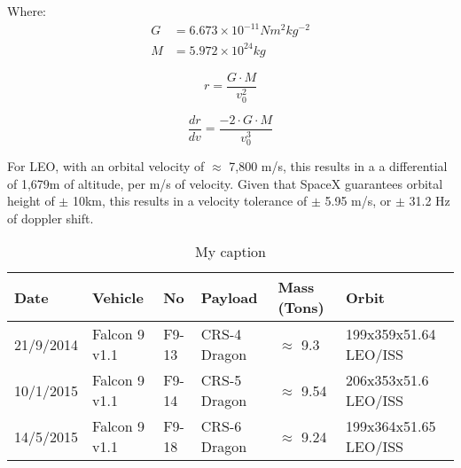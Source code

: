 Where:
\begin{align*}
G &= 6.673 \times 10^{-11} N m^2 kg^{-2}\\
M &= 5.972 \times 10^{24} kg
\end{align*}

\begin{equation}
r = \frac{G \cdot M}{v_0^2}
\end{equation}

\begin{equation}
\frac{dr}{dv} = \frac{-2 \cdot G \cdot M}{v_0^3}
\end{equation}

For \ac{LEO}, with an orbital velocity of $\approx$ 7,800 m/s, this results in a a differential of 1,679m of altitude, per m/s of velocity. Given that SpaceX guarantees orbital height of $\pm$ 10km, this results in a velocity tolerance of $\pm$ 5.95 m/s, or $\pm$ 31.2 Hz of doppler shift.


\begin{table}[!htb]
\centering
\begin{tabular}{|l|l|l|l|l|l|}
\hline
\rowcolor[HTML]{C0C0C0} 
Date      & Vehicle       & No    & Payload      & Mass (Tons)         & Orbit                  \\ \hline
21/9/2014 & Falcon 9 v1.1 & F9-13 & CRS-4 Dragon & $\approx$ 9.3  & 199x359x51.64  LEO/ISS \\ \hline
\rowcolor[HTML]{EFEFEF} 
10/1/2015 & Falcon 9 v1.1 & F9-14 & CRS-5 Dragon & $\approx$ 9.54 & 206x353x51.6 LEO/ISS   \\ \hline
14/5/2015 & Falcon 9 v1.1 & F9-18 & CRS-6 Dragon & $\approx$ 9.24 & 199x364x51.65  LEO/ISS \\ \hline
\end{tabular}
\caption{My caption}
\label{FOOBAR}
\end{table}
\cite{Falcon9Stats}


